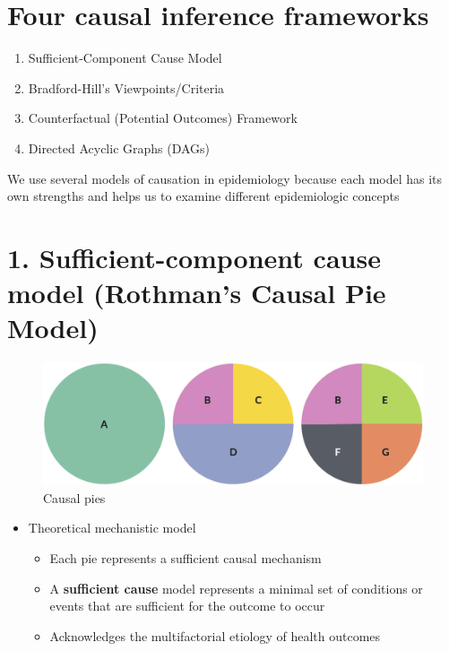 \documentclass[
]{book}
\providecommand{\tightlist}{%
  \setlength{\itemsep}{0pt}\setlength{\parskip}{0pt}}
\begin{document}
\hypertarget{four-causal-inference-frameworks}{%
\section{Four causal inference frameworks}\label{four-causal-inference-frameworks}}

\begin{enumerate}
\def\labelenumi{\arabic{enumi}.}
\tightlist
\item
  Sufficient-Component Cause Model
\item
  Bradford-Hill's Viewpoints/Criteria
\item
  Counterfactual (Potential Outcomes) Framework
\item
  Directed Acyclic Graphs (DAGs)
\end{enumerate}

We use several models of causation in epidemiology because each model has its own strengths and helps us to examine different epidemiologic concepts

\hypertarget{sufficient-component-cause-model-rothmans-causal-pie-model}{%
\section{1. Sufficient-component cause model (Rothman's Causal Pie Model)}\label{sufficient-component-cause-model-rothmans-causal-pie-model}}

\begin{figure}

{\centering \includegraphics[width=1\linewidth]{img/causality/causal_pies} 

}

\caption{Causal pies}\label{fig:unnamed-chunk-3}
\end{figure}

\begin{itemize}
\tightlist
\item
  Theoretical mechanistic model

  \begin{itemize}
  \tightlist
  \item
    Each pie represents a sufficient causal mechanism
  \item
    A \textbf{sufficient cause} model represents a minimal set of conditions or events that are sufficient for the outcome to occur
  \item
    Acknowledges the multifactorial etiology of health outcomes
  \end{itemize}
\end{itemize}
\end{document}
